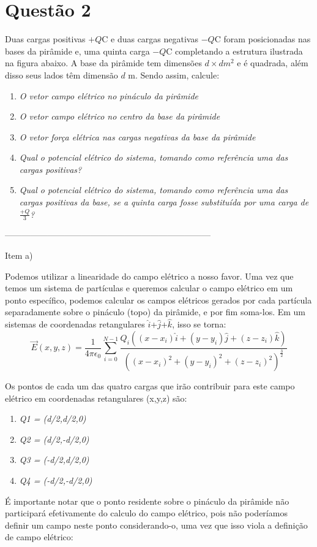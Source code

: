 \documentclass[journal,comsoc]{IEEEtran}
\begin{document}
\section{Questão 2}
\par Duas cargas positivas $+Q$C e duas cargas negativas $-Q$C foram posicionadas nas bases da pirâmide e, uma quinta carga $-Q$C completando a estrutura ilustrada na figura abaixo. A base da pirâmide tem dimensões $d\times d m^2$ e é quadrada, além disso seus lados têm dimensão $d$ m. Sendo assim, calcule:
    \begin{enumerate}
    	\item{\textit{O vetor campo elétrico no pináculo da pirâmide}}
        \item{\textit{O vetor campo elétrico no centro da base da pirâmide}}
        \item{\textit{O vetor força elétrica nas cargas negativas da base da pirâmide}}
        \item{\textit{Qual o potencial elétrico do sistema, tomando como referência uma das cargas positivas?}}
        \item{\textit{Qual o potencial elétrico do sistema, tomando como referência uma das cargas positivas da base, se a quinta carga fosse substituída por uma carga de $\frac{+Q}{3}$?}}
    \end{enumerate}
    \hfill

------------------------------------------------------------------------

Item a)
\par Podemos utilizar a linearidade do campo elétrico a nosso favor. Uma vez que temos um sistema de partículas e queremos calcular o campo elétrico em um ponto específico, podemos calcular os campos elétricos gerados por cada partícula separadamente sobre o pináculo (topo) da pirâmide, e por fim soma-los. Em um sistemas de coordenadas retangulares $\hat{i}$+$\hat{j}$+$\hat{k}$, isso se torna:  
\begin{equation}
    	\vec{E}(x,y,z) = \frac{1}{4\pi{\epsilon}_{0}} \sum_{i=0}^{N-1}
        \frac
        {{Q}_{i} ((x-{x}_{i})\hat{i}+(y-{y}_{i})\hat{j}+(z-{z}_{i})\hat{k})} 
        {((x-{x}_{i})^2+(y-{y}_{i})^2+(z-{z}_{i})^2)^\frac{3}{2}}
\end{equation}

\par Os pontos de cada um das quatro cargas que irão contribuir para este campo elétrico em coordenadas retangulares (x,y,z) são:
\begin{enumerate}
	\item{\textit{Q1 = (d/2,d/2,0)}}
    \item{\textit{Q2 = (d/2,-d/2,0)}}
    \item{\textit{Q3 = (-d/2,d/2,0)}}
    \item{\textit{Q4 = (-d/2,-d/2,0)}}
\end{enumerate}
\hfill
\par É importante notar que o ponto residente sobre o pináculo da pirâmide não participará efetivamente do calculo do campo elétrico, pois não poderíamos definir um campo neste ponto considerando-o, uma vez que isso viola a definição de campo elétrico:
\end{document}
